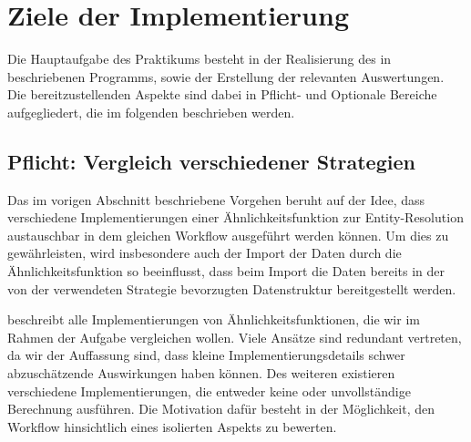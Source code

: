 \section{Ziele der Implementierung}
\label{sec:implementation}

Die Hauptaufgabe des Praktikums besteht in der Realisierung des in 
beschriebenen Programms, sowie der Erstellung der relevanten Auswertungen.
Die bereitzustellenden Aspekte sind dabei in Pflicht- und Optionale Bereiche aufgegliedert,
die im folgenden beschrieben werden.

\subsection{Pflicht: Vergleich verschiedener Strategien}

Das im vorigen Abschnitt beschriebene Vorgehen beruht auf der Idee, dass verschiedene
Implementierungen einer Ähnlichkeitsfunktion zur Entity-Resolution austauschbar
in dem gleichen Workflow ausgeführt werden können.
Um dies zu gewährleisten, wird insbesondere auch der Import der Daten durch die Ähnlichkeitsfunktion so beeinflusst,
dass beim Import die Daten bereits in der von der verwendeten Strategie bevorzugten Datenstruktur bereitgestellt werden.

 beschreibt alle Implementierungen von Ähnlichkeitsfunktionen, die wir im Rahmen der Aufgabe vergleichen wollen.
Viele Ansätze sind redundant vertreten, da wir der Auffassung sind,
dass kleine Implementierungsdetails schwer abzuschätzende Auswirkungen haben können.
Des weiteren existieren verschiedene Implementierungen, die entweder keine oder unvollständige Berechnung ausführen.
Die Motivation dafür besteht in der Möglichkeit, den Workflow hinsichtlich eines isolierten Aspekts zu bewerten.

